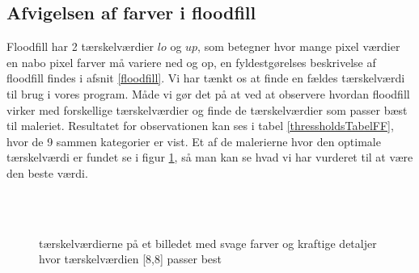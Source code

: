 \subsection{Afvigelsen af farver i floodfill}
Floodfill har 2 tærskelværdier $lo$ og $up$, som betegner hvor mange
pixel værdier en nabo pixel farver må variere ned og op, en fyldestgørelses
beskrivelse af floodfill findes i afsnit \ref{floodfill}. Vi har tænkt
os at finde en fældes tærskelværdi til brug i vores program. Måde vi gør
det på at ved at observere hvordan floodfill virker med forskellige
tærskelværdier og finde de tærskelværdier som passer bæst til
maleriet. Resultatet for observationen kan ses i tabel \ref{thressholdsTabelFF}, hvor de 9 sammen kategorier er vist. Et af de malerierne hvor den optimale tærskelværdi er fundet se i figur \ref{Floodfillbilledet}, så man kan se hvad vi har vurderet til at være den beste værdi.

\begin{figure}[!h]
    \centering
    \\
    \\
        \caption[]{tærskelværdierne på et billedet med svage farver og kraftige detaljer hvor tærskelværdien [8,8] passer best}
     \label{Floodfillbilledet}
\end{figure}

